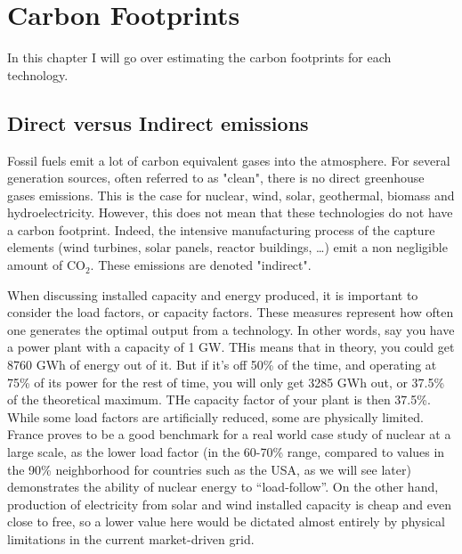 \setchapterpreamble[u]{\margintoc}
\chapter{Carbon Footprints}

In this chapter I will go over estimating the carbon footprints for each technology.



\section{Direct versus Indirect emissions}

Fossil fuels emit a lot of carbon equivalent gases into the atmosphere. For several generation sources, often referred to as "clean", there is no direct greenhouse gases emissions. This is the case for nuclear, wind, solar, geothermal, biomass and hydroelectricity. However, this does not mean that these technologies do not have a carbon footprint. Indeed, the intensive manufacturing process of the capture elements (wind turbines, solar panels, reactor buildings, \ldots) emit a non negligible amount of $\mathrm{CO_2}$. These emissions are denoted "indirect".

When discussing installed capacity and energy produced, it is important to consider the load factors, or capacity factors. These measures represent how often one generates the optimal output from a technology. In other words, say you have a power plant with a capacity of 1 GW. THis means that in theory, you could get 8760 GWh of energy out of it. But if it's off 50\% of the time, and operating at 75\% of its power for the rest of time, you will only get 3285 GWh out, or 37.5\% of the theoretical maximum. THe capacity factor of your plant is then 37.5\%. While some load factors are artificially reduced, some are physically limited. France proves to be a good benchmark for a real world case study of nuclear at a large scale, as the lower load factor (in the 60-70\% range, compared to values in the 90\% neighborhood for countries such as the USA, as we will see later) demonstrates the ability of nuclear energy to “load-follow”. On the other hand, production of electricity from solar and wind installed capacity is cheap and even close to free, so a lower value here would be dictated almost entirely by physical limitations in the current market-driven grid.



